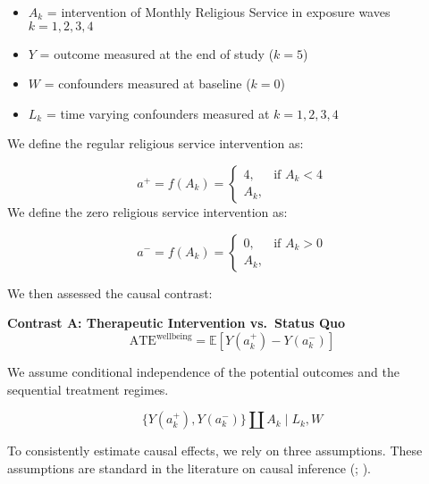 \documentclass[
  single column]{article}
\providecommand{\tightlist}{%
  \setlength{\itemsep}{0pt}\setlength{\parskip}{0pt}}\usepackage{longtable,booktabs,array}
\begin{document}
\begin{itemize}
\tightlist
\item
  \(A_k\) = intervention of Monthly Religious Service in exposure waves
  \(k={1,2,3,4}\)
\item
  \(Y\) = outcome measured at the end of study (\(k=5\))
\item
  \(W\) = confounders measured at baseline (\(k=0\))
\item
  \(L_k\) = time varying confounders measured at \(k={1,2,3,4}\)
\end{itemize}

We define the regular religious service intervention as:

\[
a^+ = f(A_k) = 
\begin{cases}
4, & \text{if } A_k < 4 \\
A_k, 
\end{cases}
\] We define the zero religious service intervention as:

\[
a^- = f(A_k) = 
\begin{cases}
0, & \text{if } A_k > 0 \\
A_k, 
\end{cases}
\]

We then assessed the causal contrast:

\textbf{Contrast A: Therapeutic Intervention vs.~Status Quo} \[
\text{ATE}^{\text{wellbeing}} = \mathbb{E}\left[Y\left(a_k^+\right) - Y\left(a_k^-\right)\right]
\]

We assume conditional independence of the potential outcomes and the
sequential treatment regimes.

\[
\big\{ Y(a_k^+), Y(a_k^-)\big\} \coprod A_k \mid L_k, W
\]

To consistently estimate causal effects, we rely on three assumptions.
These assumptions are standard in the literature on causal inference
(;
).
\end{document}
